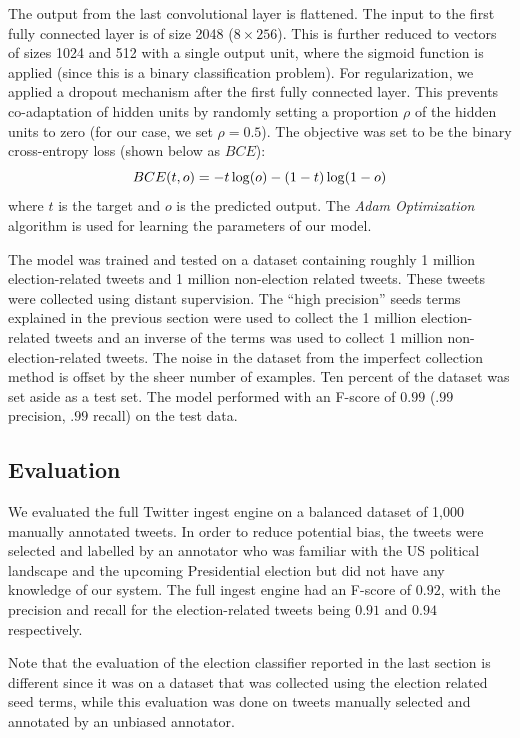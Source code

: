 \documentclass[letterpaper]{article}
\begin{document}
The output from the last convolutional layer is flattened. The input to the first fully connected layer is of size 2048 ($8\times 256$). This is further reduced to vectors of sizes 1024 and 512 with a single output unit, where the sigmoid function is applied (since this is a binary classification problem). For regularization, we applied a dropout mechanism after the first fully connected layer. This prevents co-adaptation of hidden units by randomly setting a proportion $\rho$ of the hidden units to zero (for our case, we set $\rho=0.5$). The objective was set to be the binary cross-entropy loss (shown below as $BCE$):
\begin{equation}BCE(t,o)=-t\log(o) -\\ (1-t)\log(1-o)\end{equation}
where $t$ is the target and $o$ is the predicted output. The \emph{Adam Optimization} algorithm \cite{kingma2014adam} is used for learning the parameters of our model. 

The model was trained and tested on a dataset containing roughly 1 million election-related tweets and 1 million non-election related tweets. These tweets were collected using distant supervision. The ``high precision'' seeds terms explained in the previous section were used to collect the 1 million election-related tweets and an inverse of the terms was used to collect 1 million non-election-related tweets. The noise in the dataset from the imperfect collection method is offset by the sheer number of examples. Ten percent of the dataset was set aside as a test set. The model performed with an F-score of $0.99$ ($.99$ precision, $.99$ recall) on the test data.%

\subsection{Evaluation} We evaluated the full Twitter ingest engine on a balanced dataset of 1,000 manually annotated tweets. In order to reduce potential bias, the tweets were selected and labelled by an annotator who was familiar with the US political landscape and the upcoming Presidential election but did not have any knowledge of our system. The full ingest engine had an F-score of $0.92$, with the precision and recall for the election-related tweets being $0.91$ and $0.94$ respectively.

Note that the evaluation of the election classifier reported in the last section is different since it was on a dataset that was collected using the election related seed terms, while this evaluation was done on tweets manually selected and annotated by an unbiased annotator. %
\end{document}
